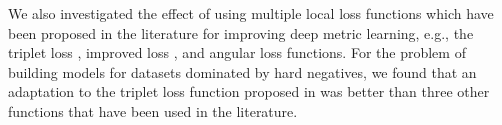We also investigated the effect of using multiple local loss functions which have been proposed in the literature for improving deep metric learning, e.g., the triplet loss \cite{DBLP:conf/cvpr/SchroffKP15}, improved loss \cite{Zhang:2016:DML:3088616.3088665}, and angular loss \cite{DBLP:journals/corr/abs-1708-01682} functions.  For the problem of building models for datasets dominated by hard negatives, we found that an adaptation to the triplet loss function proposed in \cite{DBLP:conf/cvpr/SchroffKP15} was better than three other functions that have been used in the literature. 
%


